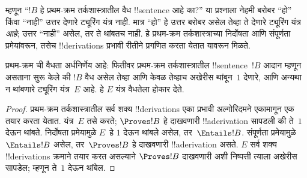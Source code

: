 \documentclass[../../../include/open-logic-section]{subfiles}
\begin{document}
\begin{explain}
म्हणून “$!B$ हे प्रथम-क्रम
तर्कशास्त्रातील वैध !!{sentence} आहे का?” या प्रश्नाला
नेहमी बरोबर “हो” किंवा
“नाही” उत्तर देणारे
ट्यूरिंग यंत्र नाही. मात्र
“हो” हे उत्तर बरोबर असेल
तेव्हा ते देणारे ट्यूरिंग
यंत्र \emph{आहे}; उत्तर
“नाही” असेल, तर ते
थांबतच नाही. हे प्रथम-क्रम
तर्कशास्त्राच्या निर्दोषता आणि
संपूर्णता प्रमेयांवरून, तसेच
!!{derivation}s प्रभावी
रीतीने प्रगणित करता येतात
यावरून मिळते.
\end{explain}

\begin{thm}
  प्रथम-क्रम ची वैधता अर्धनिर्णेय आहे:
  फितीवर प्रथम-क्रम
  तर्कशास्त्रातील !!{sentence}~$!B$ आदान म्हणून
  असताना सुरू केले की
  $!B$ वैध असेल तेव्हा आणि केवळ तेव्हाच
  अखेरीस थांबून~$1$
  देणारे, आणि अन्यथा
  न थांबणारे ट्यूरिंग
  यंत्र~$E$ आहे. हे $E$
  यंत्र वैधतेला होकार देते.
\end{thm}

\begin{proof}
  प्रथम-क्रम तर्कशास्त्रातील
  सर्व शक्य !!{derivation}s
  एका प्रभावी अल्गोरिदमने
  एकामागून एक तयार करता
  येतात. यंत्र~$E$ तसे
  करते; $\Proves
  !B$ हे दाखवणारी
  !!a{derivation}
  सापडली की ते~$1$
  देऊन थांबते. निर्दोषता
  प्रमेयामुळे $E$~हे $1$
  देऊन थांबले असेल,
  तर~$\Entails !B$.
  संपूर्णता प्रमेयामुळे
  $\Entails !B$ असेल,
  तर~$\Proves !B$
  हे दाखवणारी !!a{derivation} असते. $E$
  सर्व शक्य !!{derivation}s
  क्रमाने तयार करत असल्याने
  $\Proves !B$ दाखवणारी
  अशी निष्पत्ती त्याला
  अखेरीस सापडेल; म्हणून
  ते~$1$ देऊन थांबेल.
\end{proof}
\end{document}
